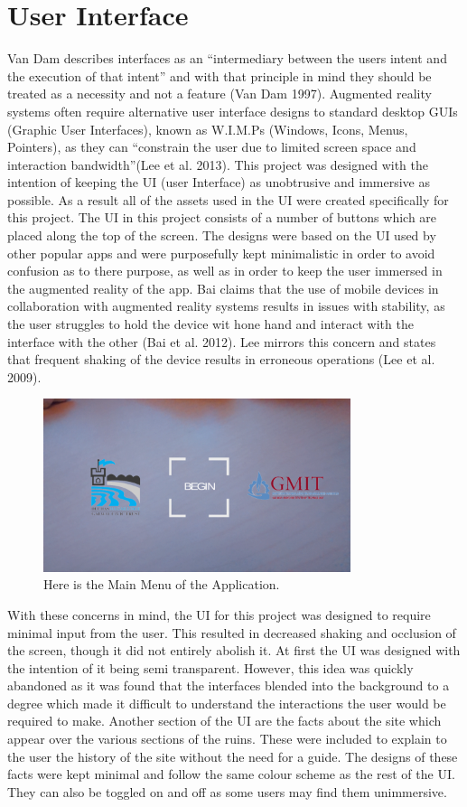 \section{User Interface}
Van Dam describes interfaces as an “intermediary between the users intent and the execution of that intent”  and with that principle in mind they should be treated as a necessity and not a feature (Van Dam 1997). Augmented reality systems often require alternative user interface designs to standard desktop GUIs (Graphic User Interfaces), known as W.I.M.Ps (Windows, Icons, Menus, Pointers), as they can “constrain the user due to limited screen space and interaction bandwidth”(Lee et al. 2013). This project was designed with the intention of keeping the UI (user Interface) as unobtrusive and immersive as possible. As a result all of the assets used in the UI were created specifically for this project. The UI in this project consists of a number of buttons which are placed along the top of the screen. The designs were based on the UI used by other popular apps and were purposefully kept minimalistic in order to avoid confusion as to there purpose, as well as in order to keep the user immersed in the augmented reality of the app.
Bai claims that the use of mobile devices in collaboration with augmented reality systems results in issues with stability, as the user struggles to hold the device wit hone hand and interact with the interface with the other (Bai et al. 2012). Lee mirrors this concern and states that frequent shaking of the device results in erroneous operations (Lee et al. 2009).

\begin{figure}[ht!]
	\centering
	\includegraphics[width=90mm]{mainMenu}
	\caption{Here is the Main Menu of the Application. \label{overflow}}
\end{figure}

With these concerns in mind, the UI for this project was designed to require minimal input from the user. This resulted in decreased shaking and occlusion of the screen, though it did not entirely abolish it.
At first the UI was designed with the intention of it being semi transparent. However, this idea was quickly abandoned as it was found that the interfaces blended into the background to a degree which made it difficult to understand the interactions the user would be required to make.
Another section of the UI are the facts about the site which appear over the various sections of the ruins. These were included to explain to the user the history of the site without the need for a guide. The designs of these facts were kept minimal and follow the same colour scheme as the rest of the UI. They can also be toggled on and off as some users may find them unimmersive.

